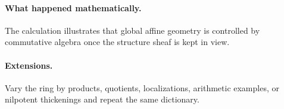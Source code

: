 \paragraph{What happened mathematically.}
The calculation illustrates that global affine geometry is controlled by commutative algebra once the structure sheaf is kept in view.

\paragraph{Extensions.}
Vary the ring by products, quotients, localizations, arithmetic examples, or nilpotent thickenings and repeat the same dictionary.
\fi
